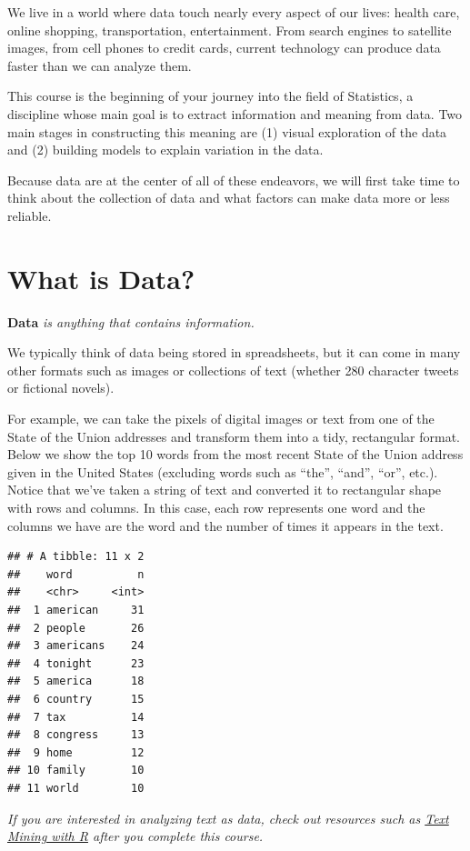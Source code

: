 \documentclass[
]{book}
\begin{document}
We live in a world where data touch nearly every aspect of our lives: health care, online shopping, transportation, entertainment. From search engines to satellite images, from cell phones to credit cards, current technology can produce data faster than we can analyze them.

This course is the beginning of your journey into the field of Statistics, a discipline whose main goal is to extract information and meaning from data. Two main stages in constructing this meaning are (1) visual exploration of the data and (2) building models to explain variation in the data.

Because data are at the center of all of these endeavors, we will first take time to think about the collection of data and what factors can make data more or less reliable.

\section{What is Data?}\label{what-is-data}

\textbf{Data} \emph{is anything that contains information.}

We typically think of data being stored in spreadsheets, but it can come in many other formats such as images or collections of text (whether 280 character tweets or fictional novels).

For example, we can take the pixels of digital images or text from one of the State of the Union addresses and transform them into a tidy, rectangular format. Below we show the top 10 words from the most recent State of the Union address given in the United States (excluding words such as ``the'', ``and'', ``or'', etc.). Notice that we've taken a string of text and converted it to rectangular shape with rows and columns. In this case, each row represents one word and the columns we have are the word and the number of times it appears in the text.

\begin{verbatim}
## # A tibble: 11 x 2
##    word          n
##    <chr>     <int>
##  1 american     31
##  2 people       26
##  3 americans    24
##  4 tonight      23
##  5 america      18
##  6 country      15
##  7 tax          14
##  8 congress     13
##  9 home         12
## 10 family       10
## 11 world        10
\end{verbatim}

\emph{If you are interested in analyzing text as data, check out resources such as \href{https://www.tidytextmining.com/}{Text Mining with R} after you complete this course.}
\end{document}
